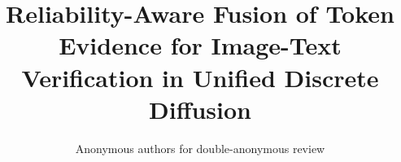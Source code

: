 \documentclass[lettersize,journal]{IEEEtran}   %
\newif\ifanon      \anontrue
\theoremstyle{plain}
\theoremstyle{definition}
\theoremstyle{remark}
\begin{document}
\title{Reliability-Aware Fusion of Token Evidence for Image-Text Verification in Unified Discrete Diffusion}

\ifanon
  \author{Anonymous authors for double-anonymous review%
  }%
\else
  \author{ANONYMIZED~ANONYMIZED, ANONYMIZED~ANONYMIZED, and ANONYMIZED%
  \thanks{This work was supported by ANONYMIZED (ANONYMIZED), ANONYMIZED, India.}%
  \thanks{(Corresponding author: ANONYMIZED.)}%
  \thanks{The authors are with the School of Computer Science and Engineering, ANONYMIZED, ANONYMIZED 632014, ANONYMIZED,
  India (e-mail: ANONYMIZED; ANONYMIZED; ANONYMIZED).}}
\fi

\maketitle
\makeatletter\global\@dbltopnum\z@\makeatother

\begin{abstract}

\end{abstract}
\end{document}
